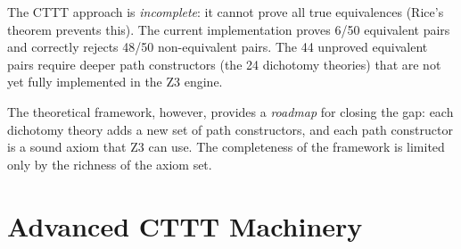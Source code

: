 \begin{remark}
The CTTT approach is \emph{incomplete}: it cannot prove all true
equivalences (Rice's theorem prevents this).  The current implementation
proves 6/50 equivalent pairs and correctly rejects 48/50 non-equivalent
pairs.  The 44 unproved equivalent pairs require deeper path
constructors (the 24 dichotomy theories) that are not yet fully
implemented in the Z3 engine.

The theoretical framework, however, provides a \emph{roadmap} for
closing the gap: each dichotomy theory adds a new set of path
constructors, and each path constructor is a sound axiom that
Z3 can use.  The completeness of the framework is limited only by
the richness of the axiom set.
\end{remark}


\part{Advanced CTTT Machinery}

